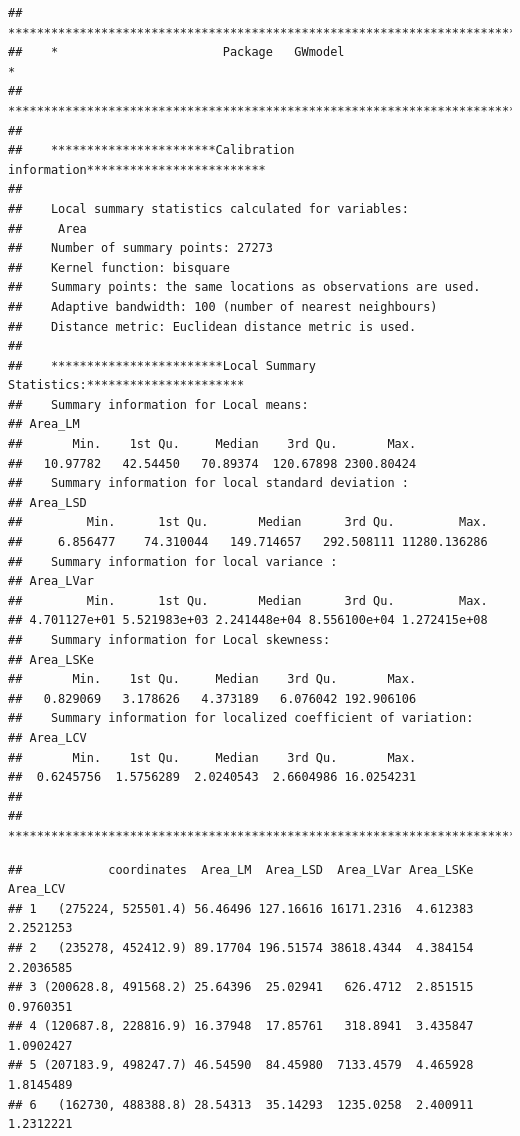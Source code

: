 \documentclass[
]{article}
\newenvironment{Shaded}{\begin{snugshade}}{\end{snugshade}}
\newcommand{\CommentTok}[1]{\textcolor[rgb]{0.56,0.35,0.01}{\textit{#1}}}
\newcommand{\FunctionTok}[1]{\textcolor[rgb]{0.13,0.29,0.53}{\textbf{#1}}}
\newcommand{\NormalTok}[1]{#1}
\newcommand{\SpecialCharTok}[1]{\textcolor[rgb]{0.81,0.36,0.00}{\textbf{#1}}}
\begin{document}
\begin{verbatim}
##    ***********************************************************************
##    *                       Package   GWmodel                             *
##    ***********************************************************************
## 
##    ***********************Calibration information*************************
## 
##    Local summary statistics calculated for variables:
##     Area
##    Number of summary points: 27273
##    Kernel function: bisquare 
##    Summary points: the same locations as observations are used.
##    Adaptive bandwidth: 100 (number of nearest neighbours)
##    Distance metric: Euclidean distance metric is used.
## 
##    ************************Local Summary Statistics:**********************
##    Summary information for Local means:
## Area_LM 
##       Min.    1st Qu.     Median    3rd Qu.       Max. 
##   10.97782   42.54450   70.89374  120.67898 2300.80424 
##    Summary information for local standard deviation :
## Area_LSD 
##         Min.      1st Qu.       Median      3rd Qu.         Max. 
##     6.856477    74.310044   149.714657   292.508111 11280.136286 
##    Summary information for local variance :
## Area_LVar 
##         Min.      1st Qu.       Median      3rd Qu.         Max. 
## 4.701127e+01 5.521983e+03 2.241448e+04 8.556100e+04 1.272415e+08 
##    Summary information for Local skewness:
## Area_LSKe 
##       Min.    1st Qu.     Median    3rd Qu.       Max. 
##   0.829069   3.178626   4.373189   6.076042 192.906106 
##    Summary information for localized coefficient of variation:
## Area_LCV 
##       Min.    1st Qu.     Median    3rd Qu.       Max. 
##  0.6245756  1.5756289  2.0240543  2.6604986 16.0254231 
## 
##    ************************************************************************
\end{verbatim}

\begin{Shaded}
\end{Shaded}

\begin{verbatim}
##            coordinates  Area_LM  Area_LSD  Area_LVar Area_LSKe  Area_LCV
## 1   (275224, 525501.4) 56.46496 127.16616 16171.2316  4.612383 2.2521253
## 2   (235278, 452412.9) 89.17704 196.51574 38618.4344  4.384154 2.2036585
## 3 (200628.8, 491568.2) 25.64396  25.02941   626.4712  2.851515 0.9760351
## 4 (120687.8, 228816.9) 16.37948  17.85761   318.8941  3.435847 1.0902427
## 5 (207183.9, 498247.7) 46.54590  84.45980  7133.4579  4.465928 1.8145489
## 6   (162730, 488388.8) 28.54313  35.14293  1235.0258  2.400911 1.2312221
\end{verbatim}
\end{document}
